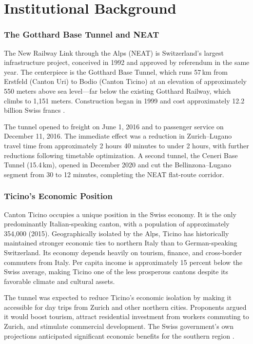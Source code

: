 \documentclass[12pt]{article}
\begin{document}
\section{Institutional Background}

\subsubsection*{The Gotthard Base Tunnel and NEAT} The New Railway Link through the Alps (NEAT) is Switzerland's largest infrastructure project, conceived in 1992 and approved by referendum in the same year. The centerpiece is the Gotthard Base Tunnel, which runs 57\,km from Erstfeld (Canton Uri) to Bodio (Canton Ticino) at an elevation of approximately 550 meters above sea level---far below the existing Gotthard Railway, which climbs to 1,151 meters. Construction began in 1999 and cost approximately 12.2 billion Swiss francs \citep{sbb2016}.

The tunnel opened to freight on June 1, 2016 and to passenger service on December 11, 2016. The immediate effect was a reduction in Zurich--Lugano travel time from approximately 2 hours 40 minutes to under 2 hours, with further reductions following timetable optimization. A second tunnel, the Ceneri Base Tunnel (15.4\,km), opened in December 2020 and cut the Bellinzona--Lugano segment from 30 to 12 minutes, completing the NEAT flat-route corridor.

\subsubsection*{Ticino's Economic Position} Canton Ticino occupies a unique position in the Swiss economy. It is the only predominantly Italian-speaking canton, with a population of approximately 354,000 (2015). Geographically isolated by the Alps, Ticino has historically maintained stronger economic ties to northern Italy than to German-speaking Switzerland. Its economy depends heavily on tourism, finance, and cross-border commuters from Italy. Per capita income is approximately 15 percent below the Swiss average, making Ticino one of the less prosperous cantons despite its favorable climate and cultural assets.

The tunnel was expected to reduce Ticino's economic isolation by making it accessible for day trips from Zurich and other northern cities. Proponents argued it would boost tourism, attract residential investment from workers commuting to Zurich, and stimulate commercial development. The Swiss government's own projections anticipated significant economic benefits for the southern region \citep{bat2016}.
\end{document}
